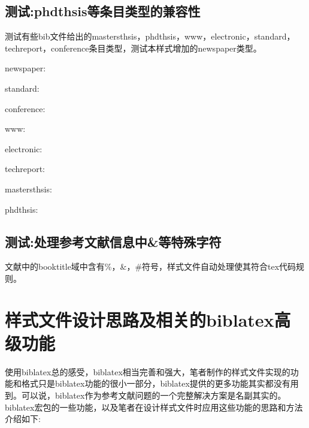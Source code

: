 \subsection{测试:phdthsis等条目类型的兼容性}\label{sec:entrytype:compatibility}
\begin{refsection}
测试有些bib文件给出的mastersthsis，phdthsis，www，electronic，standard，techreport，conference条目类型，测试本样式增加的newspaper类型。

    newspaper:\cite{张田勤2000--}\par
     standard:\cite{全国文献工作标准化委员会第七分委员会1986--,国家标准局信息分类编码研究所1988-59-92}\par
   conference:\cite{Li2004-21-24}\par
          www:\cite{萧钰2001--}\par
   electronic:\cite{OMG2003--}\par
   techreport:\cite{Humphrey1971--}\par
 mastersthsis:\cite{张志祥1998--}\par
     phdthsis:\cite{张若凌2004--}\par

\printbibliography[heading=bibliography,title=【兼容phdthsis等条目类型】]
\end{refsection}

\subsection{测试:处理参考文献信息中\&等特殊字符}\label{sec:entrytype:compatibility}
\begin{refsection}
文献中\cite{ref-replace-char}的booktitle域中含有\%，\&，\#符号，样式文件自动处理使其符合tex代码规则。

\printbibliography[heading=bibliography,title=【处理参考文献信息中\&等特殊字符】]
\end{refsection}

\section{样式文件设计思路及相关的biblatex高级功能}\label{sec:biblatex:mech}
使用biblatex总的感受，biblatex相当完善和强大，笔者制作的样式文件实现的功能和格式只是biblatex功能的很小一部分，biblatex提供的更多功能其实都没有用到。可以说，biblatex作为参考文献问题的一个完整解决方案是名副其实的。biblatex宏包的一些功能，以及笔者在设计样式文件时应用这些功能的思路和方法介绍如下:

